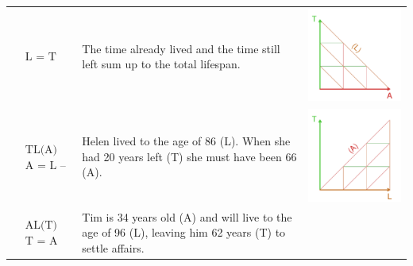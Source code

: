 \documentclass[12pt,oneside,a4paper]{article} %
\theoremstyle{definition}
\begin{document}
\begin{longtable}{m{}L{0.4\textwidth}C{0.2\textwidth}}
$$\begin{aligned}
    &\text{L = T + A}
  \end{aligned}$$ &
  The time already lived and the time still left sum up to the total lifespan. &
  \includegraphics[scale=.5]{Figures/DiagramTable/TA_rt.pdf}   
  \\
  $$\begin{aligned}
    &\text{TL(A)} \\
    &\text{A = L -- T}
  \end{aligned}$$ &
  Helen lived to the age of 86 (L). When she had 20 years left (T) she must have been 66 (A). &
  \includegraphics[scale=.5]{Figures/DiagramTable/TL_rt.pdf}   
 \\
  $$\begin{aligned}
    &\text{AL(T)} \\
    &\text{T = A -- L}
  \end{aligned}$$ &
  Tim is 34 years old (A) and will live to the age of 96 (L), leaving him 62 years (T) to settle affairs. &

\end{longtable}
\end{document}

